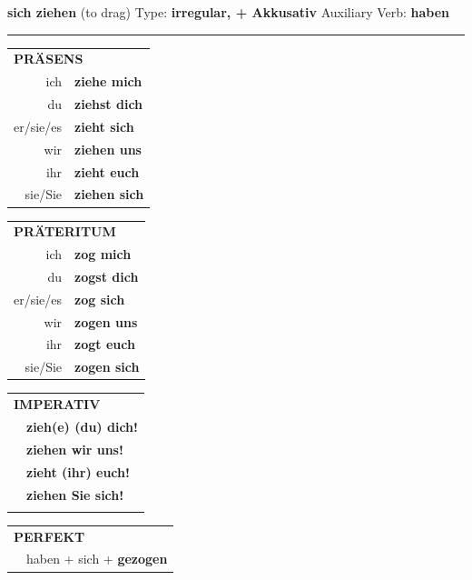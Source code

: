 \documentclass[10pt,a4paper]{revtex4-2}
\begin{document}
\begin{verbbox-acc}
        {\Large \bf sich ziehen} (to drag) \hfill Type: \textbf{irregular, + Akkusativ} \hfill Auxiliary Verb: \textbf{haben} 
    
       \vspace{5pt}

    \hrule
    
    \vspace{5pt}

  \begin{tabular}{rl}
     \multicolumn{2}{l}{\textbf{PRÄSENS} }\\
    ich & \textbf{ziehe mich}\\
    du & \textbf{ziehst dich}\\
    er/sie/es & \textbf{zieht sich}\\
    wir & \textbf{ziehen uns}\\
    ihr & \textbf{zieht euch}\\
    sie/Sie & \textbf{ziehen sich}\\
  \end{tabular}
  \hfill
     \begin{tabular}{rl}
    \multicolumn{2}{l}{\textbf{PRÄTERITUM} }\\
    ich & \textbf{zog mich}\\
    du & \textbf{zogst dich}\\
    er/sie/es & \textbf{zog sich}\\
    wir & \textbf{zogen uns}\\
    ihr & \textbf{zogt euch}\\
    sie/Sie & \textbf{zogen sich}\\
  \end{tabular}
  \hfill
  \begin{tabular}{rl}
     \multicolumn{2}{l}{\textbf{IMPERATIV} }\\
   & \textbf{zieh(e) (du) dich!}\\
   & \textbf{ziehen wir uns!}\\
   & \textbf{zieht (ihr) euch!}\\
   & \textbf{ziehen Sie sich!}\\
   & \vspace{10pt}
  \end{tabular}

    \vspace{10pt}

 \begin{tabular}{rl}
     \multicolumn{2}{l}{\textbf{PERFEKT}}\\
    &haben + sich + \textbf{gezogen}\\
  \end{tabular}
\hfill
   \begin{tabular}{rl}
   

\end{tabular}
\end{verbbox-acc}
\end{document}
